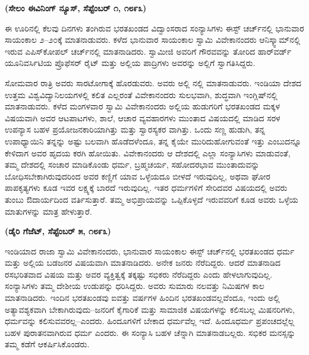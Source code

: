 \delimiter

\begin{center}
\textbf{(ಸೇಲಂ ಈವಿನಿಂಗ್​ ನ್ಯೂಸ್​, ಸೆಪ್ಟೆಂಬರ್​ ೧, ೧೮೯೩)}
\end{center}

\vskip -0.35cm

ಈ ಊರಿನಲ್ಲಿ ಕೆಲವು ದಿನಗಳು ತಂಗಿರುವ ಭರತಖಂಡದ ವಿದ್ವಾಂಸರಾದ ಸಂನ್ಯಾಸಿಗಳು ಈಸ್ಟ್​ ಚರ್ಚ್​ನಲ್ಲಿ ಭಾನುವಾರ ಸಾಯಂಕಾಲ ೨–೨೦ಕ್ಕೆ ಮಾತನಾಡುವರು. ಕಳೆದ ಭಾನುವಾರ ಸಾಯಂಕಾಲ ಸ್ವಾಮಿ ವಿವೇಕಾನಂದರು ಆನಿಸ್ಕ್ವಾಮ್​ನಲ್ಲಿ ಇರುವ ಎಪಿಸ್​\break ಕೋಪಲ್​ ಚರ್ಚ್​ನಲ್ಲಿ ಮಾತನಾಡಿದರು. ಸ್ವಾಮೀಜಿ ಅವರಿಗೆ ಗೌರವವನ್ನು ತೋರಿದ ಹಾರ್​ವರ್ಡ್​ ಯೂನಿವರ್ಸಿಟಿಯ ಪ್ರೊಫೆಸರ್​ ರೈಟ್​ ಮತ್ತು ಅಲ್ಲಿಯ ಪಾದ್ರಿಗಳು ಅವರನ್ನು ಅಲ್ಲಿಗೆ ಸ್ವಾಗತಿಸಿದ್ದರು.

ಸೋಮವಾರ ರಾತ್ರಿ ಅವರು ಸಾರಟೋಗಾಕ್ಕೆ ಹೊರಡುವರು. ಅವರು ಅಲ್ಲಿ\break {} ನಲ್ಲಿ ಮಾತನಾಡುವರು. ಇಂಡಿಯಾ ದೇಶದ ಉತ್ತಮ ವಿಶ್ವವಿದ್ಯಾನಿಲಯಗಳಲ್ಲಿ ಕಲಿತ ಎಲ್ಲರಂತೆ ವಿವೇಕಾನಂದರು ಸುಲಭವಾಗಿ, ಶುದ್ಧವಾಗಿ ಇಂಗ್ಲಿಷ್​ನಲ್ಲಿ ಮಾತನಾಡುವರು. ಕಳೆದ ಮಂಗಳವಾರ ಸ್ವಾಮಿ ವಿವೇಕಾನಂದರು ಅಲ್ಲಿಯ ಹುಡುಗರಿಗೆ ಭರತಖಂಡದ ಮಕ್ಕಳ ವಿಷಯವಾಗಿ ಅವರ ಆಟಪಾಟಗಳು, ಶಾಲೆ, ಆಚಾರ ವ್ಯವಹಾರಗಳು ಮುಂತಾದ ವಿಷಯದಲ್ಲಿ ಮಾಡಿದ ಸರಳ ಉಪನ್ಯಾಸ ಬಹಳ ಪ್ರಯೋಜನಕಾರಿಯಾಗಿತ್ತು ಮತ್ತು ಸ್ವಾರಸ್ಯಕರ ವಾಗಿತ್ತು. ಒಂದು ಸಣ್ಣ ಹುಡುಗಿ, ತನ್ನ ಉಪಾಧ್ಯಾಯಿನಿ ತನ್ನನ್ನು ಅಷ್ಟು ಬಲವಾಗಿ ಹೊಡೆದಳೆಂದೂ, ತನ್ನ ಕೈಯೇ ಮುರಿದುಹೋಗುವಂತೆ ಇತ್ತು ಎಂಬುದನ್ನೂ ಕೇಳಿದಾಗ ಅವರ ಹೃದಯ ಕರಗಿ ಹೋಯಿತು. ವಿವೇಕಾನಂದರು ಆ ದೇಶದಲ್ಲಿ ಎಲ್ಲಾ ಸಂನ್ಯಾಸಿಗಳು ಮಾಡುವಂತೆ, ತಮ್ಮ ದೇಶದಲ್ಲಿ ಸಂಚಾರ ಮಾಡಿಕೊಂಡು ಧರ್ಮ, ಬ್ರಹ್ಮಚರ್ಯ, ಸಹೋದರಭಾವ ಮುಂತಾದುವನ್ನು ಬೋಧಿಸಬೇಕಾಗಿರುವುದರಿಂದ ಅವರ ಕಣ್ಣಿಗೆ ಯಾವ ಒಳ್ಳೆಯದೂ ಬೀಳದೆ ಇರುವುದಿಲ್ಲ, ಅಥವಾ ಘೋರ ಪಾಪಕೃತ್ಯಗಳು ಕೂಡ ಇವರ ಲಕ್ಷ್ಯಕ್ಕೆ ಬಾರದೆ ಇರುವುದಿಲ್ಲ. ಇತರ ಧರ್ಮಗಳಿಗೆ ಸೇರಿದವರ ವಿಷಯದಲ್ಲಿ ಅವರು ತುಂಬು ಔದಾರ್ಯದಿಂದ ವರ್ತಿಸುತ್ತಾರೆ. ತಮ್ಮ ಅಭಿಪ್ರಾಯವನ್ನು ಒಪ್ಪಿಕೊಳ್ಳದೆ ಇರುವವರಿಗೆ ಕೂಡ ಅವರು ಒಳ್ಳೆಯ ಮಾತುಗಳನ್ನು ಮಾತ್ರ ಹೇಳುತ್ತಾರೆ.

\delimiter

\begin{center}
\textbf{(ಡೈರಿ ಗೆಜೆಟ್​, ಸೆಪ್ಟೆಂಬರ್​ ೫, ೧೮೯೩)}
\end{center}

\vskip -0.35cm

ಇಂಡಿಯಾದ ರಾಜಾ ಸ್ವಾಮಿ ವಿವೇಕಾನಂದರು, ಭಾನುವಾರ ಸಾಯಂಕಾಲ ಈಸ್ಟ್​ ಚರ್ಚ್​ನಲ್ಲಿ ಭರತಖಂಡದ ಧರ್ಮ ಮತ್ತು ಅಲ್ಲಿಯ ಬಡಜನರ ವಿಷಯವಾಗಿ ಮಾತನಾಡಿದರು. ಅನೇಕ ಜನರು ನೆರೆದಿದ್ದರು. ಆದರೆ ಮಾತನಾಡಿದ ರಸಭರಿತವಾದ ವಿಷಯ ಮತ್ತು ಅವರ ವ್ಯಕ್ತಿತ್ವಕ್ಕೆ ತಕ್ಕಷ್ಟು ಸಭಿಕರು ನೆರೆದಿದ್ದರು ಎಂದು ಹೇಳಲಾಗುವುದಿಲ್ಲ. ಸಂನ್ಯಾಸಿಗಳು ತಮ್ಮ ದೇಶೀಯ ಉಡುಪನ್ನು ಧರಿಸಿದ್ದರು. ಅವರು ಸುಮಾರು ನಲವತ್ತು ನಿಮಿಷಗಳ ಕಾಲ ಮಾತನಾಡಿದರು. ಇಂದಿನ ಭರತಖಂಡವು ಐವತ್ತು ವರ್ಷಗಳ ಹಿಂದಿನ ಭರತಖಂಡವಲ್ಲವೆಂದೂ, ಇಂದು ಅಲ್ಲಿ ಅತ್ಯಾವಶ್ಯಕವಾಗಿ ಬೇಕಾಗಿರುವುದು–ಜನರಿಗೆ ಕೈಗಾರಿಕೆ ಮತ್ತು ಸಾಮಾಜಿಕ ವಿಷಯಗಳನ್ನು ಕಲಿಸಬಲ್ಲ ಮಿಷನರಿಗಳು, ಧರ್ಮವನ್ನು ಕಲಿಸುವವರಲ್ಲ–ಎಂದರು. ಹಿಂದೂಗಳಿಗೆ ಬೇಕಾದ ಧರ್ಮವೆಲ್ಲ ಇದೆ. ಹಿಂದೂಧರ್ಮ ಪ್ರಪಂಚದಲ್ಲೆಲ್ಲ ಬಹಳ ಪುರಾತನವಾಗಿರುವ ಧರ್ಮ ಎಂದರು. ಈ ಸಂನ್ಯಾಸಿ ಬಹಳ ಚೆನ್ನಾಗಿ ಮಾತನಾಡಬಲ್ಲರು. ಸಭಿಕರ ಮನಸ್ಸನ್ನು ತಮ್ಮ ಕಡೆಗೆ ಆಕರ್ಷಿಸಿಕೊಂಡರು.

